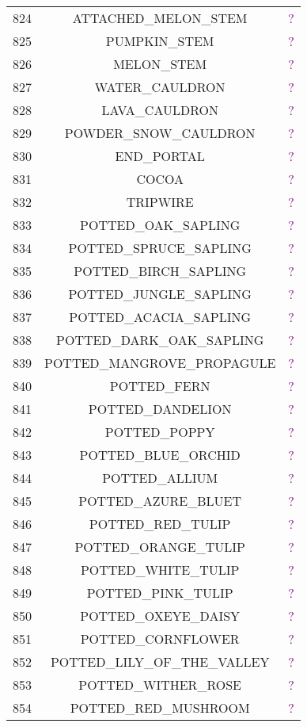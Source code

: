 \documentclass[11pt]{article}
\newcommand\myworries[1]{\textcolor{purple}{#1}}
\begin{document}
\begin{longtable}{ |c|c|c| }
	824 & ATTACHED\_MELON\_STEM & \myworries{?} \\
	825 & PUMPKIN\_STEM & \myworries{?} \\
	826 & MELON\_STEM & \myworries{?} \\
	827 & WATER\_CAULDRON & \myworries{?} \\
	828 & LAVA\_CAULDRON & \myworries{?} \\
	829 & POWDER\_SNOW\_CAULDRON & \myworries{?} \\
	830 & END\_PORTAL & \myworries{?} \\
	831 & COCOA & \myworries{?} \\
	832 & TRIPWIRE & \myworries{?} \\
	833 & POTTED\_OAK\_SAPLING & \myworries{?} \\
	834 & POTTED\_SPRUCE\_SAPLING & \myworries{?} \\
	835 & POTTED\_BIRCH\_SAPLING & \myworries{?} \\
	836 & POTTED\_JUNGLE\_SAPLING & \myworries{?} \\
	837 & POTTED\_ACACIA\_SAPLING & \myworries{?} \\
	838 & POTTED\_DARK\_OAK\_SAPLING & \myworries{?} \\
	839 & POTTED\_MANGROVE\_PROPAGULE & \myworries{?} \\
	840 & POTTED\_FERN & \myworries{?} \\
	841 & POTTED\_DANDELION & \myworries{?} \\
	842 & POTTED\_POPPY & \myworries{?} \\
	843 & POTTED\_BLUE\_ORCHID & \myworries{?} \\
	844 & POTTED\_ALLIUM & \myworries{?} \\
	845 & POTTED\_AZURE\_BLUET & \myworries{?} \\
	846 & POTTED\_RED\_TULIP & \myworries{?} \\
	847 & POTTED\_ORANGE\_TULIP & \myworries{?} \\
	848 & POTTED\_WHITE\_TULIP & \myworries{?} \\
	849 & POTTED\_PINK\_TULIP & \myworries{?} \\
	850 & POTTED\_OXEYE\_DAISY & \myworries{?} \\
	851 & POTTED\_CORNFLOWER & \myworries{?} \\
	852 & POTTED\_LILY\_OF\_THE\_VALLEY & \myworries{?} \\
	853 & POTTED\_WITHER\_ROSE & \myworries{?} \\
	854 & POTTED\_RED\_MUSHROOM & \myworries{?} \\

\end{longtable}
\end{document}
